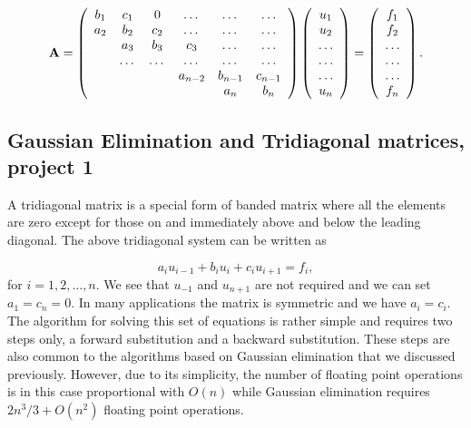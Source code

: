 \documentclass[%
twoside,                 %
final,                   %
10pt]{article}
\begin{document}
{{\[
    {\bf A} = \left(\begin{array}{cccccc}
                           b_1& c_1 & 0 &\dots   & \dots &\dots \\
                           a_2 & b_2 & c_2 &\dots &\dots &\dots \\
                           & a_3 & b_3 & c_3 & \dots & \dots \\
                           & \dots   & \dots &\dots   &\dots & \dots \\
                           &   &  &a_{n-2}  &b_{n-1}& c_{n-1} \\
                           &    &  &   &a_n & b_n \\
                      \end{array} \right)\left(\begin{array}{c}
                           u_1\\
                           u_2\\
                           \dots \\
                          \dots  \\
                          \dots \\
                           u_n\\
                      \end{array} \right)
  =\left(\begin{array}{c}
                           f_1\\
                           f_2\\
                           \dots \\
                           \dots \\
                          \dots \\
                           f_n\\
                      \end{array} \right).
\]

\subsection{Gaussian Elimination and Tridiagonal matrices, project 1}

A tridiagonal matrix is a special form of banded matrix where all the elements are zero except for
those on and immediately above and below the leading diagonal.
The above tridiagonal system   can be written as

\[
  a_iu_{i-1}+b_iu_i+c_iu_{i+1} = f_i,
\]
for $i=1,2,\dots,n$. We see that $u_{-1}$ and $u_{n+1}$ are not required and we can set $a_1=c_n=0$.
In many applications the matrix is symmetric and we have $a_i=c_i$.
The algorithm for solving this set of equations is rather simple and requires two steps only,
a forward substitution and a backward substitution. These steps are also
common to the algorithms based on
Gaussian elimination that
we discussed previously. However, due to its simplicity, the number of floating point operations
is in this
case proportional with $O(n)$ while Gaussian elimination requires $2n^3/3+O(n^2)$ floating point operations.

}}
\end{document}
